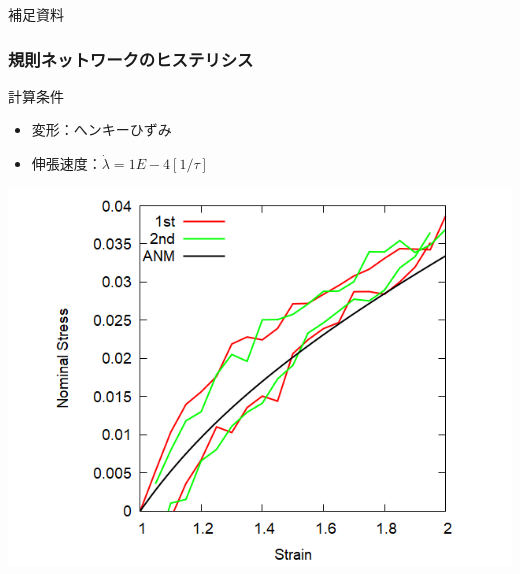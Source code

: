 \documentclass[12pt, dvipdfmx]{beamer}
\begin{document}
\appendix

\begin{frame}
	\LARGE{補足資料}
\end{frame}


\begin{frame}
    \frametitle{規則ネットワークのヒステリシス}
        \begin{block}{計算条件}
            \begin{itemize}
                \item 変形：へンキーひずみ
                \item 伸張速度：$\dot{\lambda} = 1E-4 [1/\tau]$
            \end{itemize}
        \end{block}
        \begin{center}
            \includegraphics[width=.6\textwidth]{hyst_4chain_reg.png}
        \end{center}
\end{frame}
\end{document}
